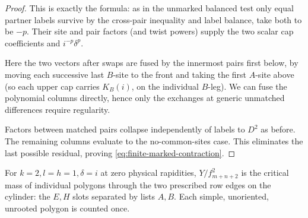 \begin{proof}
This is exactly the formula: as in the unmarked balanced test only equal partner labels survive by the cross-pair inequality and label balance, take both to be \(-p\). Their site and pair factors (and twist powers) supply the two scalar cap coefficients and \(i^{-p}\delta^p\).

Here the two vectors after swaps are fused by the innermost pairs first below, by moving each successive last \(B\)-site to the front and taking the first \(A\)-site above (so each upper cap carries \(K_B(i)\), on the individual \(B\)-leg). We can fuse the polynomial columns directly, hence only the exchanges at generic unmatched differences require regularity.

Factors between matched pairs collapse independently of labels to \(D^2\) as before. The remaining columns evaluate to the no-common-sites case. This eliminates the last possible residual, proving \eqref{eq:finite-marked-contraction}.
\end{proof}

\begin{auxproposition}
For \(k=2,l=h=1,\delta=i\) at zero physical rapidities, \(Y/f_{m+n+2}^2\) is the critical mass of individual polygons through the two prescribed row edges on the cylinder: the \(E,H\) slots separated by lists \(A,B\). Each simple, unoriented, unrooted polygon is counted once.
\end{auxproposition}

